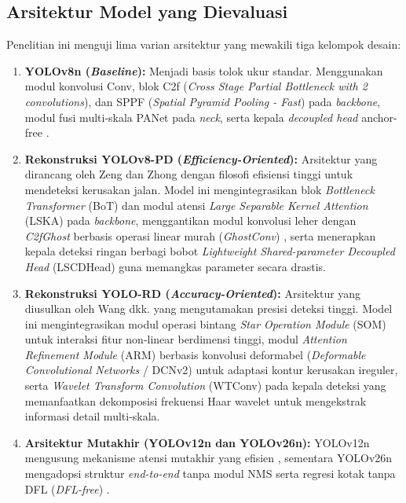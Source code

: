\subsection{Arsitektur Model yang Dievaluasi}
Penelitian ini menguji lima varian arsitektur yang mewakili tiga kelompok desain:
\begin{enumerate}
	\item \textbf{YOLOv8n (\textit{Baseline}):} Menjadi basis tolok ukur standar. Menggunakan modul konvolusi Conv, blok C2f (\textit{Cross Stage Partial Bottleneck with 2 convolutions}), dan SPPF (\textit{Spatial Pyramid Pooling - Fast}) pada \textit{backbone}, modul fusi multi-skala PANet pada \textit{neck}, serta kepala \textit{decoupled head} anchor-free \cite{Li2024, Zeng2024}.
	\item \textbf{Rekonstruksi YOLOv8-PD (\textit{Efficiency-Oriented}):} Arsitektur yang dirancang oleh Zeng dan Zhong \cite{Zeng2024} dengan filosofi efisiensi tinggi untuk mendeteksi kerusakan jalan. Model ini mengintegrasikan blok \textit{Bottleneck Transformer} (BoT) dan modul atensi \textit{Large Separable Kernel Attention} (LSKA) pada \textit{backbone}, menggantikan modul konvolusi leher dengan \textit{C2fGhost} berbasis operasi linear murah (\textit{GhostConv}) \cite{han2020ghostnet}, serta menerapkan kepala deteksi ringan berbagi bobot \textit{Lightweight Shared-parameter Decoupled Head} (LSCDHead) guna memangkas parameter secara drastis.
	\item \textbf{Rekonstruksi YOLO-RD (\textit{Accuracy-Oriented}):} Arsitektur yang diusulkan oleh Wang dkk. \cite{Wang2025} yang mengutamakan presisi deteksi tinggi. Model ini mengintegrasikan modul operasi bintang \textit{Star Operation Module} (SOM) untuk interaksi fitur non-linear berdimensi tinggi, modul \textit{Attention Refinement Module} (ARM) berbasis konvolusi deformabel (\textit{Deformable Convolutional Networks} / DCNv2) \cite{dai2017deformable} untuk adaptasi kontur kerusakan ireguler, serta \textit{Wavelet Transform Convolution} (WTConv) pada kepala deteksi yang memanfaatkan dekomposisi frekuensi Haar wavelet untuk mengekstrak informasi detail multi-skala.
	\item \textbf{Arsitektur Mutakhir (YOLOv12n dan YOLOv26n):} YOLOv12n mengusung mekanisme atensi mutakhir yang efisien \cite{tian2026yolov12}, sementara YOLOv26n mengadopsi struktur \textit{end-to-end} tanpa modul NMS serta regresi kotak tanpa DFL (\textit{DFL-free}) \cite{sapkota2025yolo26}.
\end{enumerate}

